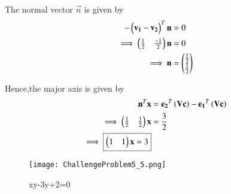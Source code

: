 \documentclass[journal,12pt,twocolumn]{IEEEtran}
\begin{document}
\begin{enumerate}
    The normal vector $\vec{n}$ is given by
    \begin{align}
        -\begin{pmatrix}\mathbf{v_1}-\mathbf{v_2}\end{pmatrix}^T\mathbf{n} &= 0
        \\
        \implies \begin{pmatrix}\frac{1}{2} & \frac{-1}{2}\end{pmatrix}\mathbf{n} &= 0
        \\
        \implies \mathbf{n} &= \begin{pmatrix}\frac{1}{2} \\ \frac{1}{2}\end{pmatrix}
    \end{align}
    
    Hence,the major axis is given by
    \begin{align}
        \mathbf{n}^T\mathbf{x} &= \mathbf{e_2}^T\left(\mathbf{V}\mathbf{c}\right) - \mathbf{e_1}^T\left(\mathbf{V}\mathbf{c}\right)
        \\
        \implies \begin{pmatrix}\frac{1}{2} & \frac{1}{2}\end{pmatrix}\mathbf{x} &= \frac{3}{2}
        \\
        \implies \boxed{\begin{pmatrix}1 & 1\end{pmatrix}\mathbf{x} = 3}
    \end{align}
    
    \begin{figure}[!ht]
    \centering
    \texttt{[image: ChallengeProblem5\_5.png]}
    \caption{xy-3y+2=0}
    \label{ex5}	
    \end{figure}
    
\end{enumerate}
\end{document}

